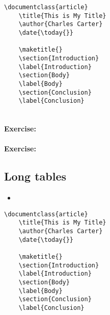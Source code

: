         \begin{verbatim}
\documentclass{article}
    \title{This is My Title}
    \author{Charles Carter}
    \date{\today{}}
 
    \maketitle{}
    \section{Introduction}
    \label{Introduction}
    \section{Body}
    \label{Body}
    \section{Conclusion}
    \label{Conclusion}
    
        \end{verbatim}

        \paragraph{Exercise:}

        \paragraph{Exercise:}


        \subsection{Long tables}
        \label{Long tables}
        
        \begin{framed}
            \begin{itemize}
                \item{}
            \end{itemize}
        \end{framed}


        \begin{verbatim}
\documentclass{article}
    \title{This is My Title}
    \author{Charles Carter}
    \date{\today{}}
 
    \maketitle{}
    \section{Introduction}
    \label{Introduction}
    \section{Body}
    \label{Body}
    \section{Conclusion}
    \label{Conclusion}
    
        \end{verbatim}

